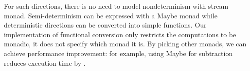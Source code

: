 For such directions, there is no need to model nondeterminism with stream monad.
Semi-determinism can be expressed with a Maybe monad while deterministic directions can be converted into simple functions.
Our implementation of functional conversion only restricts the computations to be monadic, it does not specify which monad it is.
By picking other monads, we can achieve performance improvement: for example, using Maybe for subtraction reduces execution time by .

